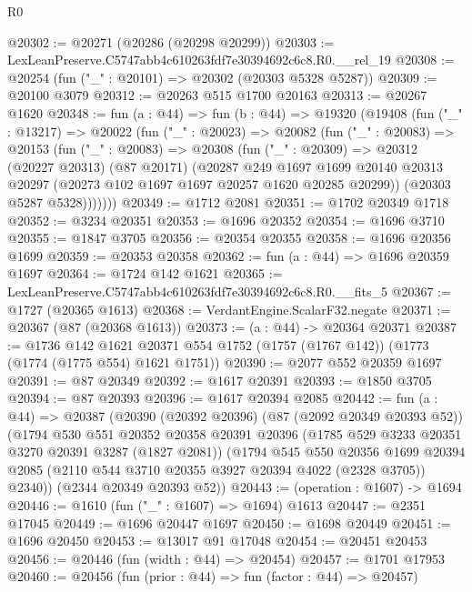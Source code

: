 \begin{lexlean}{R0}
\begin{coremodule}
@20302 := @20271 (@20286 (@20298 @20299))
@20303 := LexLeanPreserve.C5747abb4c610263fdf7e30394692c6c8.R0.__rel_19
@20308 := @20254 (fun ("_" : @20101) => @20302 (@20303 @5328 @5287))
@20309 := @20100 @3079
@20312 := @20263 @515 @1700 @20163
@20313 := @20267 @1620
@20348 := fun (a : @44) =>
  fun (b : @44) =>
  @19320
    (@19408
      (fun ("_" : @13217) =>
      @20022
        (fun ("_" : @20023) =>
        @20082
          (fun ("_" : @20083) =>
          @20153
            (fun ("_" : @20083) =>
            @20308
              (fun ("_" : @20309) =>
              @20312
                (@20227 @20313)
                (@87 @20171)
                (@20287
                  @249
                  @1697
                  @1699
                  @20140
                  @20313
                  @20297
                  (@20273 @102 @1697 @1697 @20257 @1620 @20285 @20299))
                (@20303 @5287 @5328)))))))
@20349 := @1712 @2081
@20351 := @1702 @20349 @1718
@20352 := @3234 @20351
@20353 := @1696 @20352
@20354 := @1696 @3710
@20355 := @1847 @3705
@20356 := @20354 @20355
@20358 := @1696 @20356 @1699
@20359 := @20353 @20358
@20362 := fun (a : @44) => @1696 @20359 @1697
@20364 := @1724 @142 @1621
@20365 := LexLeanPreserve.C5747abb4c610263fdf7e30394692c6c8.R0.__fits_5
@20367 := @1727 (@20365 @1613)
@20368 := VerdantEngine.ScalarF32.negate
@20371 := @20367 (@87 (@20368 @1613))
@20373 := (a : @44) -> @20364 @20371
@20387 := @1736
    @142
    @1621
    @20371
    @554
    @1752
    (@1757 (@1767 @142))
    (@1773 (@1774 (@1775 @554) @1621 @1751))
@20390 := @2077 @552 @20359 @1697
@20391 := @87 @20349
@20392 := @1617 @20391
@20393 := @1850 @3705
@20394 := @87 @20393
@20396 := @1617 @20394 @2085
@20442 := fun (a : @44) =>
  @20387
    (@20390
      (@20392 @20396)
      (@87 (@2092 @20349 @20393 @52))
      (@1794
        @530
        @551
        @20352
        @20358
        @20391
        @20396
        (@1785 @529 @3233 @20351 @3270 @20391 @3287 (@1827 @2081))
        (@1794
          @545
          @550
          @20356
          @1699
          @20394
          @2085
          (@2110 @544 @3710 @20355 @3927 @20394 @4022 (@2328 @3705))
          @2340))
      (@2344 @20349 @20393 @52))
@20443 := (operation : @1607) -> @1694
@20446 := @1610 (fun ("_" : @1607) => @1694) @1613
@20447 := @2351 @17045
@20449 := @1696 @20447 @1697
@20450 := @1698 @20449
@20451 := @1696 @20450
@20453 := @13017 @91 @17048
@20454 := @20451 @20453
@20456 := @20446 (fun (width : @44) => @20454)
@20457 := @1701 @17953
@20460 := @20456 (fun (prior : @44) => fun (factor : @44) => @20457)

\end{coremodule}
\end{lexlean}
